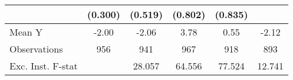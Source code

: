 {\begin{tabular}{l*{5}{c}}
            &     (0.300)         &     (0.519)         &     (0.802)         &     (0.835)         &                     \\
\midrule
Mean Y      &       -2.00         &       -2.06         &        3.78         &        0.55         &       -2.12         \\
Observations&         956         &         941         &         967         &         918         &         893         \\
Exc. Inst. F-stat&                     &      28.057         &      64.556         &      77.524         &      12.741         \\
\bottomrule
\end{tabular}
}
